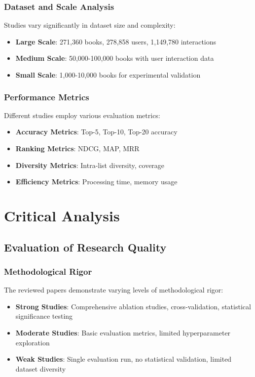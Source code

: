 \documentclass[12pt,a4paper]{article}
\begin{document}
\subsubsection{Dataset and Scale Analysis}
Studies vary significantly in dataset size and complexity:
\begin{itemize}
    \item \textbf{Large Scale}: 271,360 books, 278,858 users, 1,149,780 interactions
    \item \textbf{Medium Scale}: 50,000-100,000 books with user interaction data
    \item \textbf{Small Scale}: 1,000-10,000 books for experimental validation
\end{itemize}

\subsubsection{Performance Metrics}
Different studies employ various evaluation metrics:
\begin{itemize}
    \item \textbf{Accuracy Metrics}: Top-5, Top-10, Top-20 accuracy
    \item \textbf{Ranking Metrics}: NDCG, MAP, MRR
    \item \textbf{Diversity Metrics}: Intra-list diversity, coverage
    \item \textbf{Efficiency Metrics}: Processing time, memory usage
\end{itemize}


\section{Critical Analysis}

\subsection{Evaluation of Research Quality}

\subsubsection{Methodological Rigor}
The reviewed papers demonstrate varying levels of methodological rigor:
\begin{itemize}
    \item \textbf{Strong Studies}: Comprehensive ablation studies, cross-validation, statistical significance testing
    \item \textbf{Moderate Studies}: Basic evaluation metrics, limited hyperparameter exploration
    \item \textbf{Weak Studies}: Single evaluation run, no statistical validation, limited dataset diversity
\end{itemize}
\end{document}
